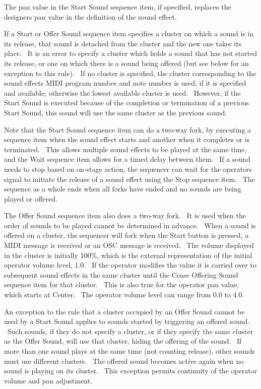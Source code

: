 \documentclass[letterpaper]{article}
\begin{document}
The pan value in the Start Sound sequence item, if specified, replaces
the designer{\textquotesingle}s pan value in the definition of the
sound effect.

If a Start or Offer Sound sequence item specifies a cluster on which a
sound is in its release, that sound is detached from the cluster and
the new one takes its place. \ It is an error to specify a cluster
which holds a sound that has not started its release, or one on which
there is a sound being offered (but see below for an exception to this
rule). \ If no cluster is specified, the cluster corresponding to the
sound effect{\textquotesingle}s MIDI program number and note number is
used, if it is specified and available; otherwise the lowest available
cluster is used. \ However, if the Start Sound is executed because of
the completion or termination of a previous Start Sound, this sound
will use the same cluster as the previous sound.

Note that the Start Sound sequence item can do a two-way fork, by
executing a sequence item when the sound effect starts and another when
it completes or is terminated. \ This allows multiple sound effects to
be played at the same time, and the Wait sequence item allows for a
timed delay between them. \ If a sound needs to stop based on on-stage
action, the sequencer can wait for the operator{\textquotesingle}s
signal to initiate the release of a sound effect using the Stop
sequence item. \ The sequence as a whole ends when all forks have ended
and no sounds are being played or offered.

The Offer Sound sequence item also does a two-way fork. \ It is used
when the order of sounds to be played cannot be determined in advance.
\ When a sound is offered on a cluster, the sequencer will fork when
the Start button is pressed, a MIDI message is received or an OSC
message is received. \ The volume displayed in the cluster is initially
100\%, which is the external representation of the initial operator
volume level, 1.0. \ If the operator modifies the value it is carried
over to subsequent sound effects in the same cluster until the Cease
Offering Sound sequence item for that cluster. \ This is also true for
the operator pan value, which starts at Center. \ The operator volume
level can range from 0.0 to 4.0.

An exception to the rule that a cluster occupied by an Offer Sound
cannot be used by a Start Sound applies to sounds started by triggering
an offered sound. \ Such sounds, if they do not specify a cluster, or
if they specify the same cluster as the Offer Sound, will use that
cluster, hiding the offering of the sound. \ If more than one sound
plays at the same time (not counting release), other sounds must use
different clusters. \ The offered sound becomes active again when no
sound is playing on its cluster. \ This exception permits continuity of
the operator volume and pan adjustment.
\end{document}
